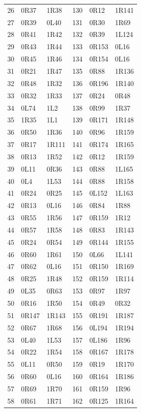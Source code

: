 \begin{longtable}{@{}rll@{\hspace{24pt}}rll@{}}
26 & 0R37 & 1R38 & 130 & 0R12 & 1R141\\
27 & 0R39 & 0L40 & 131 & 0R30 & 1R69\\
28 & 0R41 & 1R42 & 132 & 0R39 & 1L124\\
29 & 0R43 & 1R44 & 133 & 0R153 & 0L16\\
30 & 0R45 & 1R46 & 134 & 0R154 & 0L16\\
31 & 0R21 & 1R47 & 135 & 0R88 & 1R136\\
32 & 0R48 & 1R32 & 136 & 0R196 & 1R140\\
33 & 0R32 & 1R33 & 137 & 0R24 & 0R48\\
34 & 0L74 & 1L2 & 138 & 0R99 & 1R37\\
35 & 1R35 & 1L1 & 139 & 0R171 & 1R148\\
36 & 0R50 & 1R36 & 140 & 0R96 & 1R159\\
37 & 0R17 & 1R111 & 141 & 0R174 & 1R165\\
38 & 0R13 & 1R52 & 142 & 0R12 & 1R159\\
39 & 0L11 & 0R36 & 143 & 0R88 & 1L165\\
40 & 0L4 & 1L53 & 144 & 0R88 & 1R158\\
41 & 0R24 & 0R25 & 145 & 0L152 & 1L163\\
42 & 0R13 & 0L16 & 146 & 0R84 & 1R88\\
43 & 0R55 & 1R56 & 147 & 0R159 & 1R12\\
44 & 0R57 & 1R58 & 148 & 0R83 & 1R143\\
45 & 0R24 & 0R54 & 149 & 0R144 & 1R155\\
46 & 0R60 & 1R61 & 150 & 0L66 & 1L141\\
47 & 0R62 & 0L16 & 151 & 0R150 & 1R169\\
48 & 0R25 & 1R48 & 152 & 0R159 & 1R114\\
49 & 0L35 & 0R63 & 153 & 0R97 & 1R97\\
50 & 0R16 & 1R50 & 154 & 0R49 & 0R32\\
51 & 0R147 & 1R143 & 155 & 0R191 & 1R187\\
52 & 0R67 & 1R68 & 156 & 0L194 & 1R194\\
53 & 0L40 & 1L53 & 157 & 0L186 & 1R96\\
54 & 0R22 & 1R54 & 158 & 0R167 & 1R178\\
55 & 0L11 & 0R50 & 159 & 0R19 & 1R170\\
56 & 0R60 & 0L16 & 160 & 0R164 & 1R186\\
57 & 0R69 & 1R70 & 161 & 0R159 & 1R96\\
58 & 0R61 & 1R71 & 162 & 0R125 & 1R164\\

\end{longtable}
